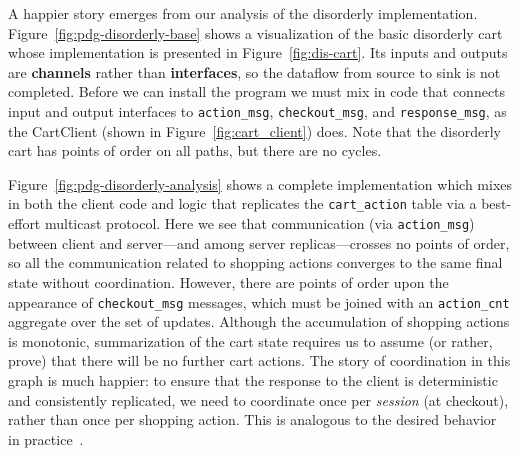 A happier story emerges from our analysis of the disorderly implementation.
Figure~\ref{fig:pdg-disorderly-base} shows a visualization of the basic disorderly
cart whose implementation is presented in Figure~\ref{fig:dis-cart}.  Its inputs and outputs
are \textbf{channels} rather than \textbf{interfaces}, so the dataflow from source to 
sink is not completed.  Before we can install the program we must mix in code that connects 
input and output interfaces to \texttt{action\_msg}, \texttt{checkout\_msg}, and 
\texttt{response\_msg}, as the CartClient (shown in Figure~\ref{fig:cart_client}) does.
Note that the disorderly cart has points of order on all paths, but 
there are no cycles.

Figure~\ref{fig:pdg-disorderly-analysis} shows a complete implementation which mixes in 
both the client code and logic that replicates the \texttt{cart\_action} table via a
best-effort multicast protocol.
Here we see that communication (via \texttt{action\_msg}) between client and
server---and among server replicas---crosses no points of order, so all the
communication related to shopping actions converges to the same final state without coordination.
However, there are points of order upon the appearance of \texttt{checkout\_msg}
messages, which must be joined with an \texttt{action\_cnt} aggregate over the set of updates.  Although the 
accumulation of shopping actions is monotonic, summarization of the cart state
requires us to assume (or rather, prove) that there will be no further cart actions.
The story of coordination in this graph is much happier: to
ensure that the response to the client is deterministic and consistently replicated, we need to coordinate once per {\em session} (at checkout), rather than once per shopping action.  This is analogous to the desired behavior in practice~\cite{quicksand}.
%

